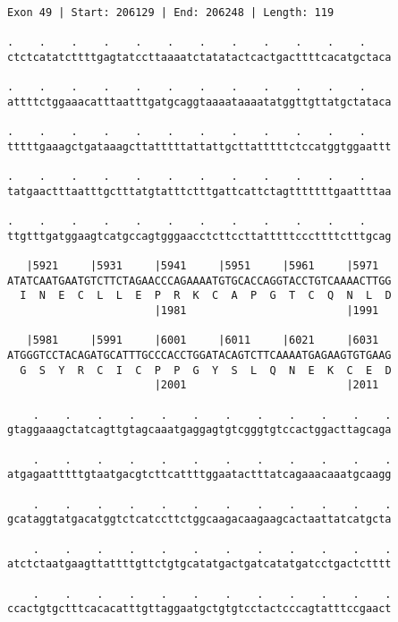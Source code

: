 \documentclass{article}
\begin{document}
\begin{Verbatim}
Exon 49 | Start: 206129 | End: 206248 | Length: 119
 
.    .    .    .    .    .    .    .    .    .    .    .    
ctctcatatcttttgagtatccttaaaatctatatactcactgacttttcacatgctaca
  
.    .    .    .    .    .    .    .    .    .    .    .    
attttctggaaacatttaatttgatgcaggtaaaataaaatatggttgttatgctataca
  
.    .    .    .    .    .    .    .    .    .    .    .    
tttttgaaagctgataaagcttatttttattattgcttatttttctccatggtggaattt
  
.    .    .    .    .    .    .    .    .    .    .    .    
tatgaactttaatttgctttatgtatttctttgattcattctagtttttttgaattttaa
  
.    .    .    .    .    .    .    .    .    .    .    .    
ttgtttgatggaagtcatgccagtgggaacctcttccttatttttcccttttctttgcag
  
   |5921     |5931     |5941     |5951     |5961     |5971  
ATATCAATGAATGTCTTCTAGAACCCAGAAAATGTGCACCAGGTACCTGTCAAAACTTGG
  I  N  E  C  L  L  E  P  R  K  C  A  P  G  T  C  Q  N  L  D
                       |1981                         |1991  
  
   |5981     |5991     |6001     |6011     |6021     |6031  
ATGGGTCCTACAGATGCATTTGCCCACCTGGATACAGTCTTCAAAATGAGAAGTGTGAAG
  G  S  Y  R  C  I  C  P  P  G  Y  S  L  Q  N  E  K  C  E  D
                       |2001                         |2011  
  
    .    .    .    .    .    .    .    .    .    .    .    .
gtaggaaagctatcagttgtagcaaatgaggagtgtcgggtgtccactggacttagcaga
  
    .    .    .    .    .    .    .    .    .    .    .    .
atgagaatttttgtaatgacgtcttcattttggaatactttatcagaaacaaatgcaagg
  
    .    .    .    .    .    .    .    .    .    .    .    .
gcataggtatgacatggtctcatccttctggcaagacaagaagcactaattatcatgcta
  
    .    .    .    .    .    .    .    .    .    .    .    .
atctctaatgaagttattttgttctgtgcatatgactgatcatatgatcctgactctttt
  
    .    .    .    .    .    .    .    .    .    .    .    .
ccactgtgctttcacacatttgttaggaatgctgtgtcctactcccagtatttccgaact
\end{Verbatim}
\newpage
\end{document}
